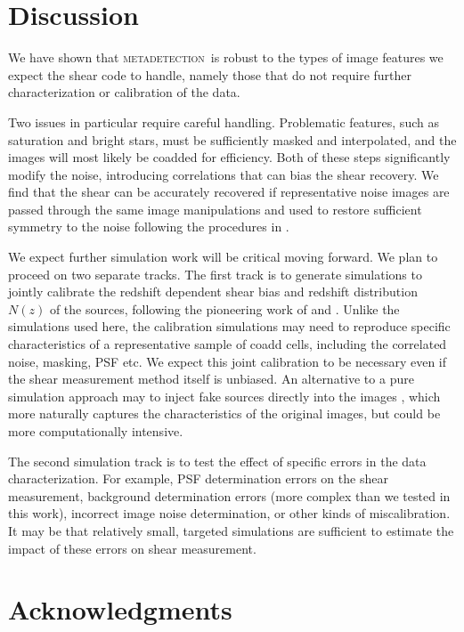 \documentclass[twocolumn,twocolappendix,astrosym]{openjournal}
\newcommand{\mdet}{\textsc{metadetection}}
\begin{document}
\section{Discussion} \label{sec:summary}

We have shown that \mdet\ is robust to the types of image features we expect
the shear code to handle, namely those that do not require further
characterization or calibration of the data.

Two issues in particular require careful handling.  Problematic features, such
as saturation and bright stars, must be sufficiently masked and interpolated,
and the images will most likely be coadded for efficiency. Both of these steps
significantly modify the noise, introducing correlations that can bias the
shear recovery.  We find that the shear can be accurately recovered if
representative noise images are passed through the same image manipulations and
used to restore sufficient symmetry to the noise following the procedures in
\cite{SheldonMcal2017}.

We expect further simulation work will be critical moving forward.  We plan to
proceed on two separate tracks.  The first track is to generate simulations to
jointly calibrate the redshift dependent shear bias and redshift distribution
$N(z)$ of the sources, following the pioneering work of \cite{MacCrann2022} and
\cite{LiNofz2022}.  Unlike the simulations used here, the calibration
simulations may need to reproduce specific characteristics of a representative
sample of coadd cells, including the correlated noise, masking, PSF etc.  We
expect this joint calibration to be necessary even if the shear measurement
method itself is unbiased.  An alternative to a pure simulation approach may to
inject fake sources directly into the images
\citep{SuchytaBalrog2016,EverettBalrog2022}, which more naturally captures the
characteristics of the original images, but could be more computationally
intensive.

The second simulation track is to test the effect of specific errors in the
data characterization.  For example, PSF determination errors on the shear
measurement, background determination errors (more complex than we tested in
this work), incorrect image noise determination, or other kinds of
miscalibration.  It may be that relatively small, targeted simulations are
sufficient to estimate the impact of these errors on shear measurement.

\section*{Acknowledgments}
\end{document}
